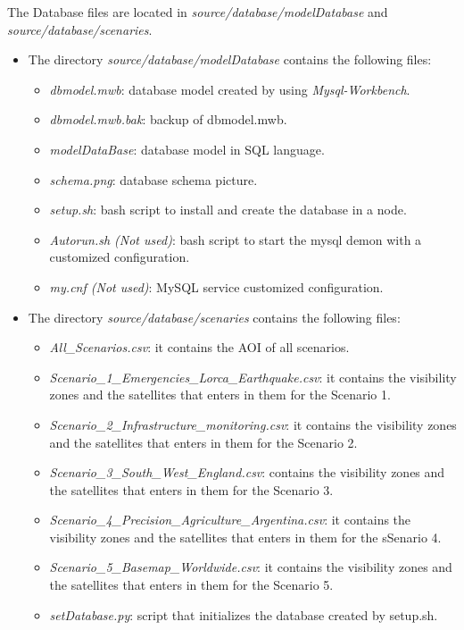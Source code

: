 The Database files are located in \emph{source/database/modelDatabase} and
\emph{source/database/scenaries}.
\begin{itemize}
\item	The directory \emph{source/database/modelDatabase} contains the
  following files:
\begin{itemize}
\item \emph{dbmodel.mwb}: database model created by using \emph{Mysql-Workbench}. 
\item \emph{dbmodel.mwb.bak}: backup of dbmodel.mwb.
\item \emph{modelDataBase}: database model in SQL language.
\item \emph{schema.png}: database schema picture.
\item \emph{setup.sh}: bash script to install and create the database in a \bonfire node.
\item \emph{Autorun.sh (Not used)}: bash script to start the mysql demon with a customized configuration.
\item \emph{my.cnf (Not used)}: MySQL service  customized configuration.
\end{itemize}
\item The directory \emph{source/database/scenaries} contains the following files:
\begin{itemize}
\item \emph{All\_Scenarios.csv}: it contains the \ac{AOI} of all scenarios.
\item \emph{Scenario\_1\_Emergencies\_Lorca\_Earthquake.csv}: it contains the visibility zones and the satellites that enters in them for the Scenario 1.
\item \emph{Scenario\_2\_Infrastructure\_monitoring.csv}: it contains the visibility zones and the satellites that enters in them for the Scenario 2.
\item \emph{Scenario\_3\_South\_West\_England.csv}: contains the visibility zones and the satellites that enters in them for the Scenario 3.
\item \emph{Scenario\_4\_Precision\_Agriculture\_Argentina.csv}: it contains the visibility zones and the satellites that enters in them for the sSenario 4.
\item \emph{Scenario\_5\_Basemap\_Worldwide.csv}: it contains the visibility zones and the satellites that enters in them for the Scenario 5.
\item \emph{setDatabase.py}: script that initializes the database created by
setup.sh.
\end{itemize}
\end{itemize}
